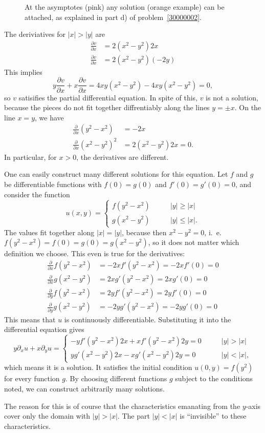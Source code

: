 \begin{loesung}
\begin{teilaufgaben}
\begin{figure}
{At the asymptotes (pink) any solution (orange example) can be attached,
as explained in
part d) of problem~\ref{30000002}.
\label{30000002:solutionfigure}}
\end{figure}
\item
The deriviatives for $|x|>|y|$ are
\begin{align*}
\frac{\partial v}{\partial x}
&=2(x^2-y^2)2x\\
\frac{\partial v}{\partial x}
&=2(x^2-y^2)(-2y)
\end{align*}
This implies
\[
y\frac{\partial v}{\partial x}
+
x \frac{\partial v}{\partial x}
=
4xy(x^2-y^2)
-4xy(x^2-y^2)=0,
\]
so $v$ satisifies the partial differential equation.
In spite of this, $v$ is not a solution, because the pieces do not
fit together diffrentiably along the  lines $y=\pm x$.
On the line $x=y$, we have
\begin{align*}
\frac{\partial}{\partial x}(y^2-x^2)&=-2x\\
\frac{\partial}{\partial x}(x^2-y^2)^2&=2(x^2-y^2)2x=0.
\end{align*}
In particular, for $x>0$, the derivatives are different.
\end{teilaufgaben}

One can easily construct many different solutions for this equation.
Let $f$ and $g$ be differentiable functions with $f(0)=g(0)$
and $f'(0)=g'(0)=0$, and consider the function
\[
u(x,y)=\begin{cases}
f(y^2-x^2)&\qquad |y|\ge|x|\\
g(x^2-y^2)&\qquad |y|\le|x|.
\end{cases}
\]
The values fit together along $|x|=|y|$, because then $x^2-y^2=0$,
i.~e.~$f(y^2-x^2)=f(0)=g(0)=g(x^2-y^2)$, so it does not matter which
definition we choose.
This even is true for the derivatives:
\begin{align*}
\frac{\partial}{\partial x}f(y^2-x^2)&=-2xf'(y^2-x^2)=-2xf'(0)=0
\\
\frac{\partial}{\partial x}g(x^2-y^2)&=2xg'(y^2-x^2)=2xg'(0)=0
\\
\frac{\partial}{\partial y}f(y^2-x^2)&=2yf'(y^2-x^2)=2yf'(0)=0
\\
\frac{\partial}{\partial y}g(x^2-y^2)&=-2yg'(y^2-x^2)=-2yg'(0)=0
\end{align*}
This means that $u$ is continuously differentiable.
Substituting it into the differential equation gives
\[
y\partial_xu+x\partial_yu
=
\begin{cases}
-yf'(y^2-x^2)2x+xf'(y^2-x^2)2y=0&\qquad |y|>|x|\\
yg'(x^2-y^2)2x-xg'(x^2-y^2)2y=0&\qquad |y|<|x|,
\end{cases}
\]
which means it is a solution.
It satisfies the initial condition $u(0,y)=f(y^2)$ for every function $g$.
By choosing different functions $g$ subject to the conditions noted,
we can construct arbitrarily many solutions.

The reason for this is of course that the characteristics emanating from
the $y$-axis cover only the domain with $|y|> |x|$.
The part $|y|<|x|$ is ``invisible'' to these characteristics.
\end{loesung}

